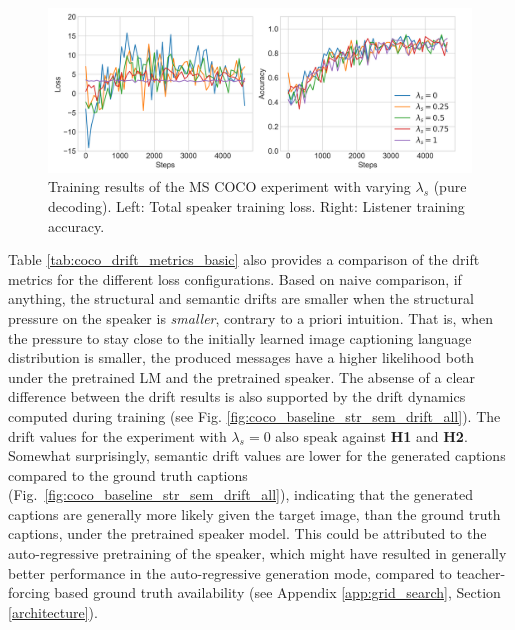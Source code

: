 \begin{figure}[h]
	\centering
	\includegraphics[width=\linewidth]{images/coco_refgame_4000_pure_all_Ls_random.png}
	\caption{Training results of the MS COCO experiment with varying $\lambda_s$ (pure decoding). Left: Total speaker training loss. Right: Listener training accuracy.}
	\label{fig:coco_baseline_speaker_loss_listener_acc_all}
\end{figure}

Table \ref{tab:coco_drift_metrics_basic} also provides a comparison of the drift metrics for the different loss configurations. Based on naive comparison, if anything, the structural and semantic drifts are smaller when the structural pressure on the speaker is \emph{smaller}, contrary to a priori intuition. That is, when the pressure to stay close to the initially learned image captioning language distribution is smaller, the produced messages have a higher likelihood both under the pretrained LM and the pretrained speaker. The absense of a clear difference between the drift results is also supported by the drift dynamics computed during training (see Fig. \ref{fig:coco_baseline_str_sem_drift_all}). 
The drift values for the experiment with $\lambda_s = 0$ also speak against \textbf{H1} and \textbf{H2}. Somewhat surprisingly, semantic drift values are lower for the generated captions compared to the ground truth captions (Fig.~\ref{fig:coco_baseline_str_sem_drift_all}), indicating that the generated captions are generally more likely given the target image, than the ground truth captions, under the pretrained speaker model. This could be attributed to the auto-regressive pretraining of the speaker, which might have resulted in generally better performance in the auto-regressive generation mode, compared to teacher-forcing based ground truth availability (see Appendix \ref{app:grid_search}, Section \ref{architecture}).

